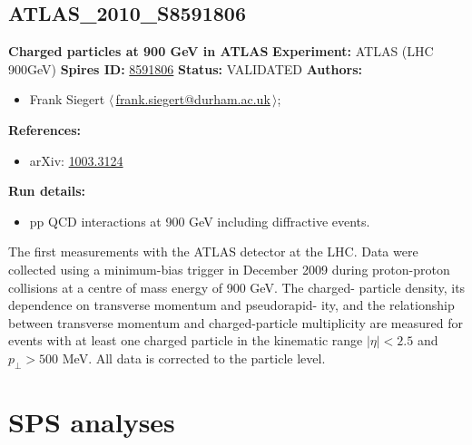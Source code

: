 \subsection[ATLAS\_2010\_S8591806]{ATLAS\_2010\_S8591806\,\cite{Collaboration:2010rd}}
\textbf{Charged particles at 900 GeV in ATLAS}\newline
\textbf{Experiment:} ATLAS (LHC 900GeV) \newline
\textbf{Spires ID:} \href{http://www.slac.stanford.edu/spires/find/hep/www?rawcmd=key+8591806}{8591806}\newline
\textbf{Status:} VALIDATED\newline
\textbf{Authors:}
\begin{itemize}
  \item Frank Siegert $\langle\,$\href{mailto:frank.siegert@durham.ac.uk}{frank.siegert@durham.ac.uk}$\,\rangle$;
\end{itemize}
\textbf{References:}
\begin{itemize}
  \item arXiv: \href{http://arxiv.org/abs/1003.3124}{1003.3124}
\end{itemize}
\textbf{Run details:}
\begin{itemize}

  \item pp QCD interactions at 900 GeV including diffractive events.\end{itemize}

\noindent The ﬁrst measurements with the ATLAS detector at the LHC. Data were collected using a minimum-bias trigger in December 2009 during proton-proton collisions at a centre of mass energy of 900 GeV. The charged- particle density, its dependence on transverse momentum and pseudorapid- ity, and the relationship between transverse momentum and charged-particle multiplicity are measured for events with at least one charged particle in the kinematic range $|\eta| < 2.5$ and $p_\perp > 500$ MeV. All data is corrected to the particle level.

\clearpage


\section{SPS analyses}
